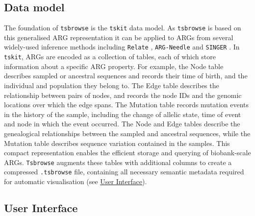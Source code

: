 \documentclass[unnumsec,webpdf,contemporary,large,namedate]{oup-authoring-template}%
\begin{document}
\subsection{Data model} \label{subsec:Data_Model} The foundation of
\texttt{tsbrowse} is the \texttt{tskit} data model. As \texttt{tsbrowse} is
based on this generalised ARG representation \citep{wong2024general} it can be applied
to ARGs from several widely-used inference methods including \texttt{Relate}
\citep{speidel2019method}, \texttt{ARG-Needle} \citep{zhang2023biobank} and \texttt{SINGER}
\citep{deng2024robust}. In \texttt{tskit}, ARGs are encoded as a
collection of tables, each of which store information about a specific ARG
property. For example, the Node table describes sampled or ancestral sequences
and records their time of birth, and the individual and population they belong
to. The Edge table describes the relationship between pairs of nodes, and
records the node IDs and the genomic locations over which the edge spans. The
Mutation table records mutation events in the history of the sample, including
the change of allelic state, time of event and node in which the event
occurred. The Node and Edge tables describe the genealogical relationships
between the sampled and ancestral sequences, while the Mutation table describes
sequence variation contained in the samples. This compact
representation enables the efficient storage and querying of biobank-scale
ARGs. \texttt{Tsbrowse} augments these tables with additional columns to create
a compressed \texttt{.tsbrowse} file, containing all necessary semantic
metadata required for automatic visualisation (see
\hyperref[subsec:User_Interface]{User Interface}). 

\subsection{User Interface}
\label{subsec:User_Interface}
\end{document}
